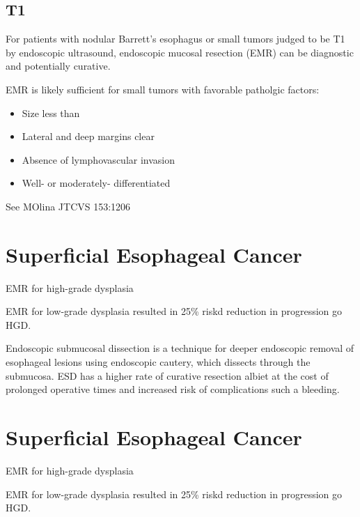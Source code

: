 \documentclass[
]{book}
\providecommand{\tightlist}{%
  \setlength{\itemsep}{0pt}\setlength{\parskip}{0pt}}
\begin{document}
\hypertarget{t1}{%
\section{T1}\label{t1}}

For patients with nodular Barrett's esophagus or small tumors judged to be T1 by endoscopic ultrasound, endoscopic mucosal resection (EMR) can be diagnostic and potentially curative.\citep{pech652}

EMR is likely sufficient for small tumors with favorable patholgic factors:

\begin{itemize}
\tightlist
\item
  Size less than
\item
  Lateral and deep margins clear
\item
  Absence of lymphovascular invasion
\item
  Well- or moderately- differentiated
\end{itemize}

See MOlina JTCVS 153:1206

\hypertarget{superficial-esophageal-cancer}{%
\chapter{Superficial Esophageal Cancer}\label{superficial-esophageal-cancer}}

EMR for high-grade dysplasia \citep{shaheen2277}

EMR for low-grade dysplasia \citep{phoa1209} resulted in 25\% riskd reduction in progression go HGD.

Endoscopic submucosal dissection is a technique for deeper endoscopic removal of esophageal lesions using endoscopic cautery, which dissects through the submucosa. ESD has a higher rate of curative resection \citep{cao751} albiet at the cost of prolonged operative times and increased risk of complications such a bleeding.

\hypertarget{superficial-esophageal-cancer-1}{%
\chapter{Superficial Esophageal Cancer}\label{superficial-esophageal-cancer-1}}

EMR for high-grade dysplasia \citep{shaheen2277}

EMR for low-grade dysplasia \citep{phoa1209} resulted in 25\% riskd reduction in progression go HGD.
\end{document}
